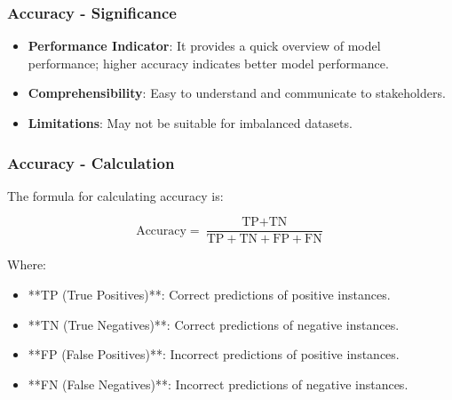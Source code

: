 \documentclass[aspectratio=169]{beamer}
\begin{document}
\begin{frame}[fragile]
    \frametitle{Accuracy - Significance}
    \begin{itemize}
        \item \textbf{Performance Indicator}: It provides a quick overview of model performance; higher accuracy indicates better model performance.
        \item \textbf{Comprehensibility}: Easy to understand and communicate to stakeholders.
        \item \textbf{Limitations}: May not be suitable for imbalanced datasets.
    \end{itemize}
\end{frame}

\begin{frame}[fragile]
    \frametitle{Accuracy - Calculation}
    The formula for calculating accuracy is:

    \begin{equation}
        \text{Accuracy} = \frac{\text{TP} + \text{TN}}{\text{TP} + \text{TN} + \text{FP} + \text{FN}}
    \end{equation}

    Where:
    \begin{itemize}
        \item **TP (True Positives)**: Correct predictions of positive instances.
        \item **TN (True Negatives)**: Correct predictions of negative instances.
        \item **FP (False Positives)**: Incorrect predictions of positive instances.
        \item **FN (False Negatives)**: Incorrect predictions of negative instances.
    \end{itemize}
\end{frame}
\end{document}
